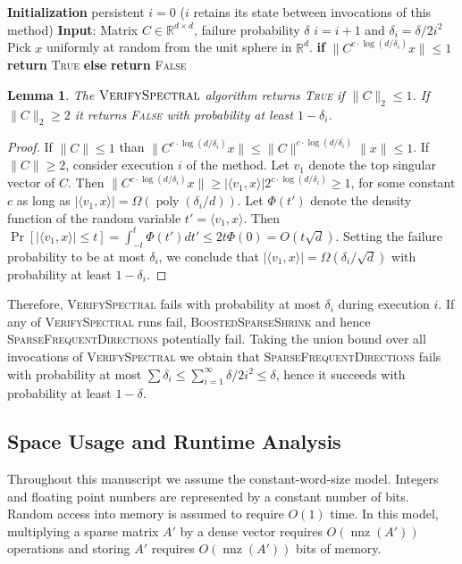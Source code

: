 \documentclass[11pt]{article}
\newcommand{\R}{\mathbb{R}}
\newcommand{\nnz}{\operatorname{nnz}}
\newcommand{\sfd}{\textsc{SparseFrequentDirections}\xspace}
\newcommand{\BSSh}{\textsc{BoostedSparseShrink}\xspace}
\newcommand{\vs}{\textsc{VerifySpectral}\xspace}
\newtheorem{lemma}{Lemma}[section]
\begin{document}
\begin{algorithm}[H]
\caption{\vs}
\label{alg:verifyspectral}
\begin{algorithmic}
\STATE \textbf{Initialization} persistent $i=0$ ($i$ retains its state between invocations of this method)
\STATE \textbf{Input}: Matrix $C\in\R^{d\times d}$, failure probability $\delta$
\STATE $i = i+1$ and $\delta_i = \delta/2i^2$
\STATE Pick $x$ uniformly at random from the unit sphere in $\R^d$.  
\STATE \textbf{if} $\|C^{c \cdot \log(d/\delta_i)} x\| \leq 1$ \textbf{return} \textsc{True}
\STATE \textbf{else} \textbf{return} \textsc{False}
\end{algorithmic}
\end{algorithm}
\begin{lemma} \label{lem:vs}
The $\vs$ algorithm returns \textsc{True} if $\|C\|_2 \le 1$. 
If $\|C\|_2 \ge 2$ it returns \textsc{False} with probability at least $1-\delta_i$.
\end{lemma}
\begin{proof}
If $\|C\|\le 1$ than $\|C^{c\cdot \log(d/\delta_i)} x\|  \le \|C\|^{c \cdot \log(d/\delta_i)} \|x\| \le 1$.
If $\|C\|\ge 2$, consider execution $i$ of the method. Let $v_1$ denote the top singular vector of $C$. Then  $\|C^{c\cdot\log(d/\delta_i)} x\| \ge |\langle v_1,x \rangle| 2^{c\cdot \log(d/\delta_i)} \ge 1$, for some constant $c$ as long as  $|\langle v_1,x \rangle| = \Omega( \operatorname{poly}(\delta_i/d))$. Let $\Phi(t')$ denote the density function of the random variable 
$t' = \langle v_1,x \rangle$. Then $\Pr[|\langle v_1,x \rangle| \le t] = \int_{-t}^{t}\Phi(t')dt'  \le 2t\Phi(0) = O(t\sqrt{d})$. Setting the failure probability to be at most $\delta_i$, we conclude that $|\langle v_1,x \rangle| = \Omega(\delta_i/\sqrt{d})$ with probability at least $1-\delta_i$. 
\end{proof}

Therefore, \vs fails with probability at most  $\delta_i$ during execution $i$. 
If any of \vs runs fail, \BSSh and hence \sfd potentially fail.
Taking the union bound over all invocations of \vs we obtain that \sfd fails with probability at most $\sum \delta_i \le \sum_{i=1}^{\infty} \delta/2 i^2 \le \delta$, hence it succeeds with probability at least $1-\delta$. 








\subsection{Space Usage and Runtime Analysis}\label{sec:runtime_analysis}
Throughout this manuscript we assume the constant-word-size model. 
Integers and floating point numbers are represented by a constant number of bits. 
Random access into memory is assumed to require $O(1)$ time.
In this model, multiplying a sparse matrix $A'$ by a dense vector requires $O(\nnz(A'))$ operations and storing $A'$ requires $O(\nnz(A'))$ bits of memory. 
\end{document}
